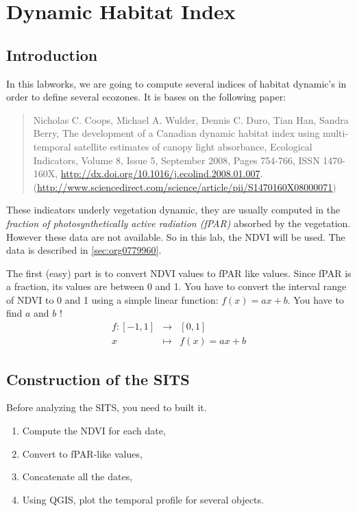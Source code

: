 \documentclass[a4paper,11pt,DIV=18]{scrartcl}
\begin{document}
\section{Dynamic Habitat Index}
\label{sec:org00b76fe}
\subsection{Introduction}
\label{sec:orge4f774b}
In this labworks, we are going to compute several indices of habitat
dynamic's in order to define several ecozones. It is bases on the
following paper:

\begin{quote}
Nicholas C. Coops, Michael A. Wulder, Dennis C. Duro, Tian Han, Sandra
Berry,  The development  of  a Canadian  dynamic  habitat index  using
multi-temporal  satellite   estimates  of  canopy   light  absorbance,
Ecological  Indicators,  Volume  8,  Issue 5,  September  2008,  Pages
754-766,                        ISSN                        1470-160X,
\url{http://dx.doi.org/10.1016/j.ecolind.2008.01.007}.
(\url{http://www.sciencedirect.com/science/article/pii/S1470160X08000071})
\end{quote}

These indicators underly vegetation dynamic, they are usually computed
in the \emph{fraction of photosynthetically active radiation (fPAR)} absorbed
by the vegetation.  However these data  are not available.  So in this
lab, the NDVI will be used. The data is described in \ref{sec:org0779960}.


\begin{work}
The first (easy)  part is to convert NDVI values  to fPAR like values.
Since fPAR is a fraction, its values  are between 0 and 1. You have to
convert the interval  range of NDVI to  0 and 1 using  a simple linear
function: \(f(x)=ax+b\). You have to find \(a\) and \(b\) !
\begin{eqnarray*}
  f:[-1,1] &\to& [0,1]\\
  x&\mapsto&f(x)=ax+b
\end{eqnarray*}
\end{work}

\subsection{Construction of the SITS}
\label{sec:org578f822}
Before analyzing the  SITS, you need to built it.
\begin{work}
\begin{enumerate}
\item Compute the NDVI for each date,
\item Convert to fPAR-like values,
\item Concatenate all the dates,
\item Using QGIS,  plot the  temporal  profile for  several objects.
\end{enumerate}
\end{work}
\end{document}
